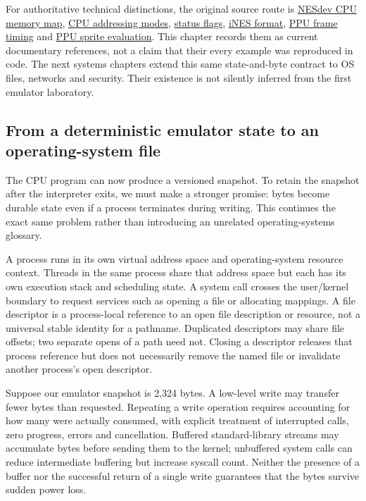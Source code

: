 For authoritative technical distinctions, the original source route is \href{https://www.nesdev.org/wiki/CPU_memory_map}{NESdev CPU memory map}, \href{https://www.nesdev.org/wiki/Addressing_modes}{CPU addressing modes}, \href{https://www.nesdev.org/wiki/Status_flag}{status flags}, \href{https://www.nesdev.org/wiki/INES}{iNES format}, \href{https://www.nesdev.org/wiki/PPU_frame_timing}{PPU frame timing} and \href{https://www.nesdev.org/wiki/PPU_sprite_evaluation}{PPU sprite evaluation}. This chapter records them as current documentary references, not a claim that their every example was reproduced in code. The next systems chapters extend this same state-and-byte contract to OS files, networks and security. Their existence is not silently inferred from the first emulator laboratory.

\subsection{From a deterministic emulator state to an operating-system file}\label{from-a-deterministic-emulator-state-to-an-operating-system-file}

The CPU program can now produce a versioned snapshot. To retain the snapshot after the interpreter exits, we must make a stronger promise: bytes become durable state even if a process terminates during writing. This continues the exact same problem rather than introducing an unrelated operating-systems glossary.

A process runs in its own virtual address space and operating-system resource context. Threads in the same process share that address space but each has its own execution stack and scheduling state. A system call crosses the user/kernel boundary to request services such as opening a file or allocating mappings. A file descriptor is a process-local reference to an open file description or resource, not a universal stable identity for a pathname. Duplicated descriptors may share file offsets; two separate opens of a path need not. Closing a descriptor releases that process reference but does not necessarily remove the named file or invalidate another process's open descriptor.

Suppose our emulator snapshot is 2,324 bytes. A low-level write may transfer fewer bytes than requested. Repeating a write operation requires accounting for how many were actually consumed, with explicit treatment of interrupted calls, zero progress, errors and cancellation. Buffered standard-library streams may accumulate bytes before sending them to the kernel; unbuffered system calls can reduce intermediate buffering but increase syscall count. Neither the presence of a buffer nor the successful return of a single write guarantees that the bytes survive sudden power loss.

